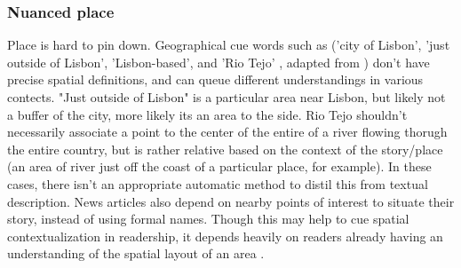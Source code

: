 \subsubsection{Nuanced place}
Place is hard to pin down. Geographical cue words such as ('city of Lisbon', 'just outside of Lisbon', 'Lisbon-based', and 'Rio Tejo' , adapted from \cite{Lieberman2010}) don't have precise spatial definitions, and can queue different understandings in various contects. %
"Just outside of Lisbon" is a particular area near Lisbon, but likely not a buffer of the city, more likely its an area to the side. Rio Tejo shouldn’t necessarily associate a point to the center of the entire of a river flowing thorugh the entire country, but is rather relative based on the context of the story/place (an area of river just off the coast of a particular place, for example). In these cases, there isn’t an appropriate automatic method to distil this from textual description.%
News articles also depend on nearby points of interest to situate their story, instead of using formal names. Though this may help to cue spatial contextualization in readership, it depends heavily on readers already having an understanding of the spatial layout of an area \cite{Lee2019}.%

